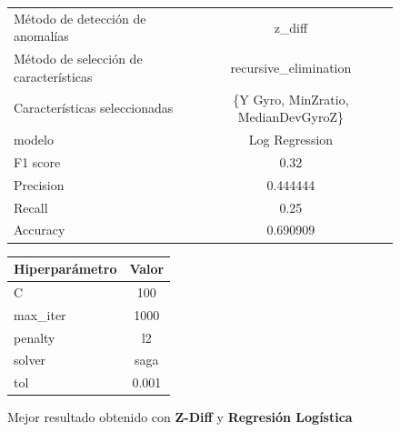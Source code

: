 \begin{appendices}
		\begin{figure}[htb]
			\centering
			\caption{Mejor resultado obtenido con \textbf{Z-Diff} y \textbf{Regresión Logística}}
			\label{table:30}
			\begin{tabular}{lc}
				\toprule
					  Método de detección de anomalías &                              z\_diff \\
				Método de selección de características &               recursive\_elimination \\
						 Características seleccionadas & \{Y Gyro, MinZratio, MedianDevGyroZ\} \\
												modelo &                      Log Regression \\
											  F1 score &                                0.32 \\
											 Precision &                            0.444444 \\
												Recall &                                0.25 \\
											  Accuracy &                            0.690909 \\
				\bottomrule
				\end{tabular}
			\newline
			\newline

			\begin{tabular}{lc}
				\toprule
				Hiperparámetro &  Valor \\
				\midrule
							 C &    100 \\
					  max\_iter &   1000 \\
					   penalty &     l2 \\
						solver &   saga \\
						   tol &  0.001 \\
				\bottomrule
			\end{tabular}
			
		\end{figure}


\end{appendices}

